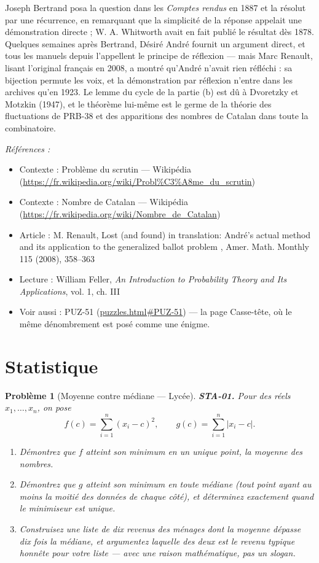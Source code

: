 \documentclass[11pt]{article}
\newtheorem{problem}{Problème}
\newenvironment{refs}{\par\small\noindent\emph{Références :}\begin{itemize}\setlength\itemsep{0pt}}{\end{itemize}\normalsize}
\begin{document}
\noindent Joseph Bertrand posa la question dans les \textit{Comptes rendus} en 1887 et la
résolut par une récurrence, en remarquant que la simplicité de la réponse appelait une
démonstration directe ; W. A. Whitworth avait en fait publié le résultat dès 1878. Quelques
semaines après Bertrand, Désiré André fournit un argument direct, et tous les manuels depuis
l'appellent \og{} le principe de réflexion \fg{} --- mais Marc Renault, lisant l'original français en 2008, a
montré qu'André n'avait rien réfléchi : sa bijection permute les voix, et la démonstration par
réflexion n'entre dans les archives qu'en 1923. Le lemme du cycle de la partie (b) est dû à
Dvoretzky et Motzkin (1947), et le théorème lui-même est le germe de la théorie des fluctuations
de PRB-38 et des apparitions des nombres de Catalan dans toute la combinatoire.

\begin{refs}
\item Contexte : Problème du scrutin --- Wikipédia (\url{https://fr.wikipedia.org/wiki/Probl%C3%A8me_du_scrutin})
\item Contexte : Nombre de Catalan --- Wikipédia (\url{https://fr.wikipedia.org/wiki/Nombre_de_Catalan})
\item Article : M. Renault, \og{} Lost (and found) in translation: André's actual method and its application to the generalized ballot problem \fg{}, Amer. Math. Monthly 115 (2008), 358--363
\item Lecture : William Feller, \textit{An Introduction to Probability Theory and Its Applications}, vol. 1, ch. III
\item Voir aussi : PUZ-51 (\url{puzzles.html#PUZ-51}) --- la page Casse-tête, où le même dénombrement est posé comme une énigme.
\end{refs}

\bigskip


\section*{Statistique}

\begin{problem}[{Moyenne contre médiane --- Lycée}]
\textbf{STA-01.} Pour des réels $ x_1, \dots, x_n $, on pose
\[ f(c) = \sum_{i=1}^{n} (x_i - c)^2 , \qquad g(c) = \sum_{i=1}^{n} |x_i - c| . \]
\begin{enumerate}
\item[(a)] Démontrez que $ f $ atteint son minimum en un unique point, la moyenne des nombres.
\item[(b)] Démontrez que $ g $ atteint son minimum en toute médiane (tout point ayant au moins la
moitié des données de chaque côté), et déterminez exactement quand le minimiseur est unique.
\item[(c)] Construisez une liste de dix \og{} revenus des ménages \fg{} dont la moyenne dépasse dix fois la
médiane, et argumentez laquelle des deux est le \og{} revenu typique \fg{} honnête pour votre liste ---
avec une raison mathématique, pas un slogan.
\end{enumerate}

\end{problem}
\end{document}
